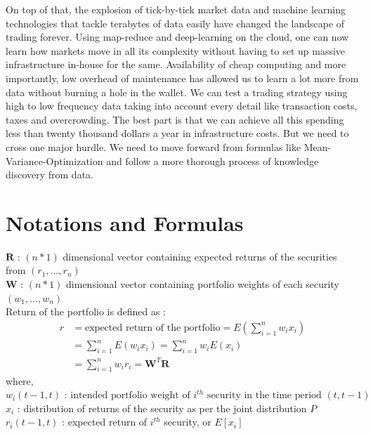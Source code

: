 \documentclass[a4paper]{article}
\begin{document}
On top of that, the explosion of tick-by-tick market data and machine learning technologies that tackle terabytes of data easily have changed the landscape of trading forever. Using map-reduce\cite{mapr2004} and deep-learning\cite{Goodfellow-et-al-2016-Book} on the cloud, one can now learn how markets move in all its complexity without having to set up massive infrastructure in-house for the same. Availability of cheap computing and more importantly, low overhead of maintenance has allowed us to learn a lot more from data without burning a hole in the wallet. We can test a trading strategy using high to low frequency data taking into account every detail like transaction costs, taxes and overcrowding. The best part is that we can achieve all this spending less than twenty thousand dollars a year in infrastructure costs. But we need to cross one major hurdle. We need to move forward from formulas like Mean-Variance-Optimization and follow a more thorough process of knowledge discovery from data.

\newpage
\appendix
\section{Notations and Formulas \label{notations} }
$\mathbf{R}$ : $(n*1)$ dimensional vector containing expected returns of the securities from $( r_1,  \dots ,r_n )$\\
$\mathbf{W}$ : $(n * 1)$ dimensional vector containing portfolio weights of each security $( w_1, \dots , w_n )$ \\
Return of the portfolio is defined as :
\begin{align*}
r &= \text{expected return of the portfolio} =E(\sum_{i=1}^n w_i x_i) \\
 &= \sum_{i=1}^n E( w_ix_i ) = \sum_{i=1}^n w_i E(x_i) \\
  &= \sum_{i=1}^nw_ir_i = \mathbf{W}^T\mathbf{R} 
\end{align*}
where, \\
$w_i(t-1,t ) \text{ : intended portfolio weight of } i^{th}  \text{ security in the time period } ( t, t-1 )$ \\
$x_i$ : distribution of returns of the security as per the joint distribution $P$ \\ 
$r_i(t-1,t)$ : expected return of $i^{th}$ security, or $E[x_i]$ \\
\end{document}
